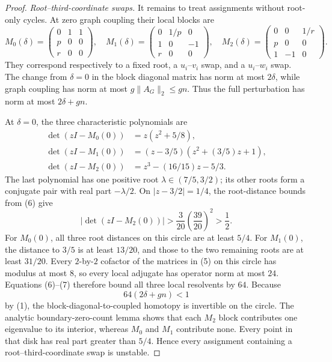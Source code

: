 \documentclass{article}
\begin{document}
\begin{proof}
\emph{Root--third-coordinate swaps.}
It remains to treat assignments without root-only cycles. At zero graph coupling their local blocks are
\[
 M_0(\delta)=
 \begin{pmatrix}0&1&1\\p&0&0\\r&0&0\end{pmatrix},\quad
 M_1(\delta)=
 \begin{pmatrix}0&1/p&0\\1&0&-1\\r&0&0\end{pmatrix},\quad
 M_2(\delta)=
 \begin{pmatrix}0&0&1/r\\p&0&0\\1&-1&0\end{pmatrix}.
\tag{5}
\]
They correspond respectively to a fixed root, a \(u_i\)--\(v_i\) swap, and a \(u_i\)--\(w_i\) swap. The change from \(\delta=0\) in the block diagonal matrix has norm at most \(2\delta\), while graph coupling has norm at most \(g\|A_G\|_2\leq gn\). Thus the full perturbation has norm at most \(2\delta+gn\).

At \(\delta=0\), the three characteristic polynomials are
\[
\begin{aligned}
 \det(zI-M_0(0))&=z(z^2+5/8),\\
 \det(zI-M_1(0))&=(z-3/5)(z^2+(3/5)z+1),\\
 \det(zI-M_2(0))&=z^3-(16/15)z-5/3.
\end{aligned}
\tag{6}
\]
The last polynomial has one positive root \(\lambda\in(7/5,3/2)\); its other roots form a conjugate pair with real part \(-\lambda/2\). On \(|z-3/2|=1/4\), the root-distance bounds from (6) give
\[
 |\det(zI-M_2(0))|
 >\frac3{20}\left(\frac{39}{20}\right)^2>\frac12.
\tag{7}
\]
For \(M_0(0)\), all three root distances on this circle are at least \(5/4\). For \(M_1(0)\), the distance to \(3/5\) is at least \(13/20\), and those to the two remaining roots are at least \(31/20\). Every \(2\)-by-\(2\) cofactor of the matrices in (5) on this circle has modulus at most \(8\), so every local adjugate has operator norm at most \(24\). Equations (6)--(7) therefore bound all three local resolvents by \(64\). Because
\[
 64(2\delta+gn)<1
\]
by (1), the block-diagonal-to-coupled homotopy is invertible on the circle. The analytic boundary-zero-count lemma shows that each \(M_2\) block contributes one eigenvalue to its interior, whereas \(M_0\) and \(M_1\) contribute none. Every point in that disk has real part greater than \(5/4\). Hence every assignment containing a root--third-coordinate swap is unstable.


\end{proof}
\end{document}
